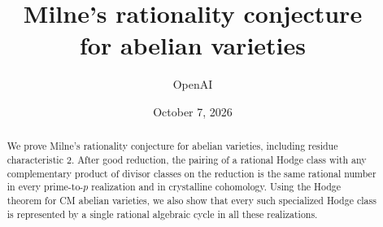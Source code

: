 \documentclass[11pt]{article}
\title{Milne's rationality conjecture\protect\\ for abelian varieties}
\author{OpenAI}
\date{October 7, 2026}
\theoremstyle{definition}
\theoremstyle{remark}
\numberwithin{equation}{section}
\begin{document}
\maketitle
\vspace{-1em}
\begin{abstract}
We prove Milne's rationality conjecture for abelian varieties, including
residue characteristic \(2\). After good reduction, the pairing of a
rational Hodge class with any complementary product of divisor classes
on the reduction is the same rational number in every prime-to-\(p\)
realization and in crystalline cohomology. Using the Hodge theorem for CM
abelian varieties, we also show that every such specialized Hodge class
is represented by a single rational algebraic cycle in all these realizations.
\end{abstract}







\end{document}
